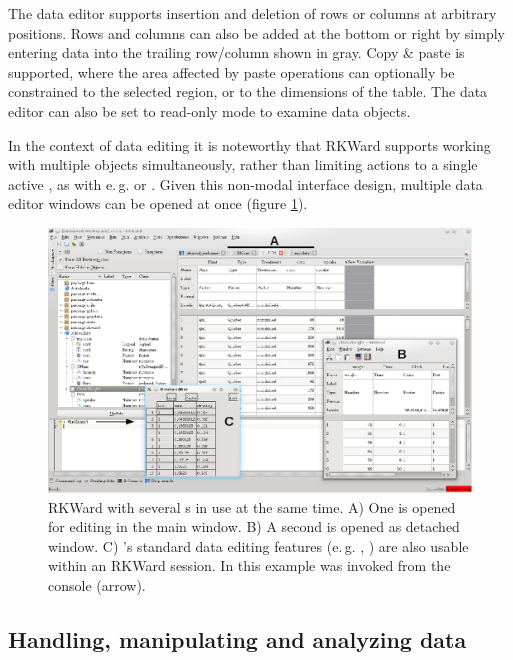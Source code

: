 The data editor supports insertion and deletion of rows or columns at
arbitrary positions. Rows and columns can also be added at the bottom or
right by simply entering data into the trailing row/column shown in
gray. Copy \& paste is supported, where the area affected by paste
operations can optionally be constrained to the selected region, or to
the dimensions of the table. The data editor can also be set to read-only
mode to examine data objects.

In the context of data editing it is noteworthy that
RKWard supports working with multiple objects simultaneously, rather than
limiting actions to a single active , as with e.\,g.  or
. Given this non-modal interface design, multiple data editor
windows can be opened at once (figure \ref{fig:data_editors}).

\begin{figure}[htp]
 \centering
 \includegraphics{../figures/data_editors.png}
 \caption{RKWard with several s in use at the same time. A) One  is opened for editing in the 
 main window. B) A second  is opened as detached window. C) 's standard data editing features 
(e.\,g. , ) are also usable within an RKWard session. 
In this example  was invoked from the console (arrow).}
 \label{fig:data_editors}
\end{figure}

\subsection{Handling, manipulating and analyzing data}
\label{sec:analyzing_data}

